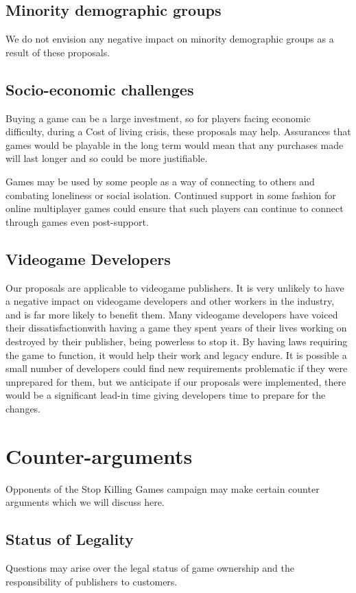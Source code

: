 \subsection{Minority demographic groups}
We do not envision any negative impact on minority demographic groups as a result of these proposals.

\subsection{Socio-economic challenges}
Buying a game can be a large investment\cn, so for players facing economic difficulty, during a Cost of living crisis, these proposals may help.
Assurances that games would be playable in the long term would mean that any purchases made will last longer and so could be more justifiable.

Games may be used by some people as a way of connecting to others and combating loneliness or social isolation\cn.
Continued support in some fashion for online multiplayer games could ensure that such players can continue to connect through games even post-support.

\subsection{Videogame Developers}
Our proposals are applicable to videogame publishers.
It is very unlikely to have a negative impact on videogame developers and other workers in the industry, and is far more likely to benefit them.
Many videogame developers have voiced their dissatisfaction\cn with having a game they spent years of their lives working on destroyed by their publisher, being powerless to stop it.
By having laws requiring the game to function, it would help their work and legacy endure.
It is possible a small number of developers could find new requirements problematic if they were unprepared for them,
but we anticipate if our proposals were implemented, there would be a significant lead-in time giving developers time to prepare for the changes.



\section{Counter-arguments}
Opponents of the Stop Killing Games campaign may make certain counter arguments which we will discuss here.

\subsection{Status of Legality}
Questions may arise over the legal status of game ownership and the responsibility of publishers to customers.

